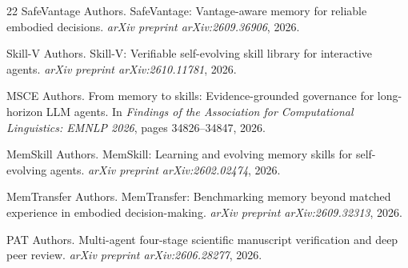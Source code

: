 \documentclass[11pt,a4paper]{article}
\begin{document}
\begin{thebibliography}{22}
SafeVantage Authors.
\newblock SafeVantage: Vantage-aware memory for reliable embodied decisions.
\newblock \emph{arXiv preprint arXiv:2609.36906}, 2026.

Skill-V Authors.
\newblock Skill-V: Verifiable self-evolving skill library for interactive agents.
\newblock \emph{arXiv preprint arXiv:2610.11781}, 2026.

MSCE Authors.
\newblock From memory to skills: Evidence-grounded governance for long-horizon LLM agents.
\newblock In \emph{Findings of the Association for Computational Linguistics: EMNLP 2026}, pages 34826--34847, 2026.

MemSkill Authors.
\newblock MemSkill: Learning and evolving memory skills for self-evolving agents.
\newblock \emph{arXiv preprint arXiv:2602.02474}, 2026.

MemTransfer Authors.
\newblock MemTransfer: Benchmarking memory beyond matched experience in embodied decision-making.
\newblock \emph{arXiv preprint arXiv:2609.32313}, 2026.

PAT Authors.
\newblock Multi-agent four-stage scientific manuscript verification and deep peer review.
\newblock \emph{arXiv preprint arXiv:2606.28277}, 2026.

\end{thebibliography}
\end{document}
